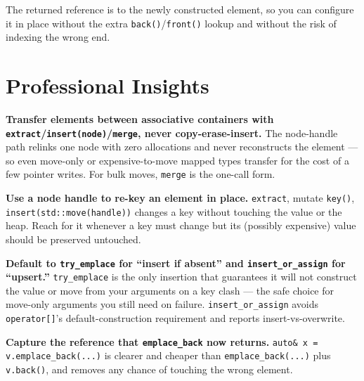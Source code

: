 The returned reference is to the newly constructed element, so you can configure it in place without the extra \texttt{back()}/\texttt{front()} lookup and without the risk of indexing the wrong end.

\section{Professional Insights}
\label{sec:c17-associative-insights}

\textbf{Transfer elements between associative containers with \texttt{extract}/\texttt{insert(node)}/\texttt{merge}, never copy-erase-insert.} The node-handle path relinks one node with zero allocations and never reconstructs the element --- so even move-only or expensive-to-move mapped types transfer for the cost of a few pointer writes. For bulk moves, \texttt{merge} is the one-call form.

\textbf{Use a node handle to re-key an element in place.} \texttt{extract}, mutate \texttt{key()}, \texttt{insert(std::move(handle))} changes a key without touching the value or the heap. Reach for it whenever a key must change but its (possibly expensive) value should be preserved untouched.

\textbf{Default to \texttt{try\_emplace} for ``insert if absent'' and \texttt{insert\_or\_assign} for ``upsert.''} \texttt{try\_emplace} is the only insertion that guarantees it will not construct the value or move from your arguments on a key clash --- the safe choice for move-only arguments you still need on failure. \texttt{insert\_or\_assign} avoids \texttt{operator[]}'s default-construction requirement and reports insert-vs-overwrite.

\textbf{Capture the reference that \texttt{emplace\_back} now returns.} \texttt{auto\& x = v.emplace\_back(...)} is clearer and cheaper than \texttt{emplace\_back(...)} plus \texttt{v.back()}, and removes any chance of touching the wrong element.
